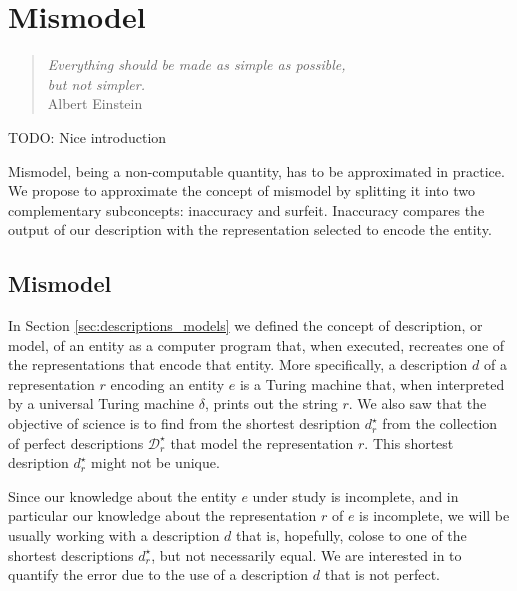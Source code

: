 %
%


\chapter{Mismodel}
\label{chap:Mismodel}

\begin{quote}
\begin{flushright}
\emph{Everything should be made as simple as possible,\\
but not simpler.}\\
Albert Einstein 
\end{flushright}
\end{quote}
\bigskip

{\color{red} TODO: Nice introduction}

Mismodel, being a non-computable quantity, has to be approximated in practice. We propose to approximate the concept of mismodel by splitting it into two complementary subconcepts: inaccuracy and surfeit. Inaccuracy compares the output of our description with the representation selected to encode the entity.

%
%

\section{Mismodel}

In Section \ref{sec:descriptions_models} we defined the concept of description, or model, of an entity as a computer program that, when executed, recreates one of the representations that encode that entity. More specifically, a description $d$ of a representation $r$ encoding an entity $e$ is a Turing machine that, when interpreted by a universal Turing machine $\delta$, prints out the string $r$. We also saw that the objective of science is to find from the shortest desription $d^\star_r$ from the collection of perfect descriptions $\mathcal{D}^\star_r$ that model the representation $r$. This shortest desription $d^\star_r$ might not be unique.

Since our knowledge about the entity $e$ under study is incomplete, and in particular our knowledge about the representation $r$ of $e$ is incomplete, we will be usually working with a description $d$ that is, hopefully, colose to one of the shortest descriptions $d^\star_r$, but not necessarily equal. We are interested in to quantify the error due to the use of a description $d$ that is not perfect.

